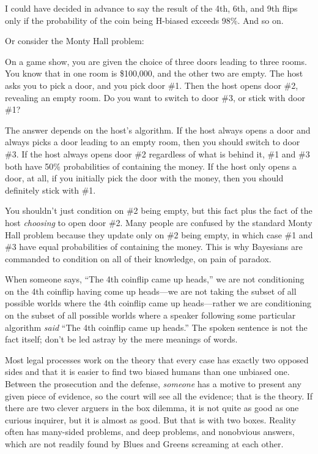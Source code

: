 {
 I could have decided in advance to say the result of the 4th, 6th,
and 9th flips only if the probability of the coin being H-biased
exceeds 98\%. And so on.}

{
 Or consider the Monty Hall problem:}

{
 On a game show, you are given the choice of three doors leading to
three rooms. You know that in one room is \$100,000, and the other two
are empty. The host asks you to pick a door, and you pick door \#1.
Then the host opens door \#2, revealing an empty room. Do you want to
switch to door \#3, or stick with door \#1?}

{
 The answer depends on the host's algorithm. If the
host always opens a door and always picks a door leading to an empty
room, then you should switch to door \#3. If the host always opens door
\#2 regardless of what is behind it, \#1 and \#3 both have 50\%
probabilities of containing the money. If the host only opens a door,
at all, if you initially pick the door with the money, then you should
definitely stick with \#1.}

{
 You shouldn't just condition on \#2 being empty,
but this fact plus the fact of the host \textit{choosing} to open door
\#2. Many people are confused by the standard Monty Hall problem
because they update only on \#2 being empty, in which case \#1 and \#3
have equal probabilities of containing the money. This is why Bayesians
are commanded to condition on all of their knowledge, on pain of
paradox.}

{
 When someone says, ``The 4th coinflip came up
heads,'' we are not conditioning on the 4th coinflip
having come up heads---we are not taking the subset of all possible
worlds where the 4th coinflip came up heads---rather we are
conditioning on the subset of all possible worlds where a speaker
following some particular algorithm \textit{said}
``The 4th coinflip came up heads.''
The spoken sentence is not the fact itself; don't be
led astray by the mere meanings of words.}

{
 Most legal processes work on the theory that every case has
exactly two opposed sides and that it is easier to find two biased
humans than one unbiased one. Between the prosecution and the defense,
\textit{someone} has a motive to present any given piece of evidence,
so the court will see all the evidence; that is the theory. If there
are two clever arguers in the box dilemma, it is not quite as good as
one curious inquirer, but it is almost as good. But that is with two
boxes. Reality often has many-sided problems, and deep problems, and
nonobvious answers, which are not readily found by Blues and Greens
screaming at each other.}

